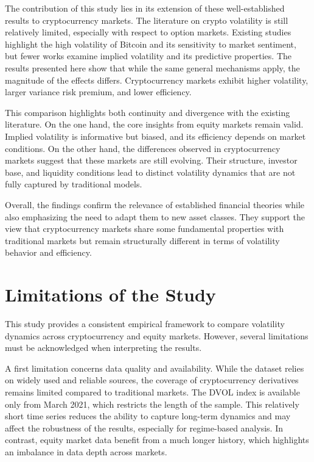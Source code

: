 \documentclass[11pt,a4paper,openany]{report}
\begin{document}
The contribution of this study lies in its extension of these
well-established results to cryptocurrency markets. The literature on
crypto volatility is still relatively limited, especially with respect
to option markets. Existing studies highlight the high volatility of
Bitcoin and its sensitivity to market sentiment, but fewer works examine
implied volatility and its predictive properties. The results presented
here show that while the same general mechanisms apply, the magnitude of
the effects differs. Cryptocurrency markets exhibit higher volatility,
larger variance risk premium, and lower efficiency.

This comparison highlights both continuity and divergence with the
existing literature. On the one hand, the core insights from equity
markets remain valid. Implied volatility is informative but biased, and
its efficiency depends on market conditions. On the other hand, the
differences observed in cryptocurrency markets suggest that these
markets are still evolving. Their structure, investor base, and
liquidity conditions lead to distinct volatility dynamics that are not
fully captured by traditional models.

Overall, the findings confirm the relevance of established financial
theories while also emphasizing the need to adapt them to new asset
classes. They support the view that cryptocurrency markets share some
fundamental properties with traditional markets but remain structurally
different in terms of volatility behavior and efficiency.

\section{Limitations of the Study}\label{limitations-of-the-study}

This study provides a consistent empirical framework to compare
volatility dynamics across cryptocurrency and equity markets. However,
several limitations must be acknowledged when interpreting the results.

A first limitation concerns data quality and availability. While the
dataset relies on widely used and reliable sources, the coverage of
cryptocurrency derivatives remains limited compared to traditional
markets. The DVOL index is available only from March 2021, which
restricts the length of the sample. This relatively short time series
reduces the ability to capture long-term dynamics and may affect the
robustness of the results, especially for regime-based analysis. In
contrast, equity market data benefit from a much longer history, which
highlights an imbalance in data depth across markets.
\end{document}
